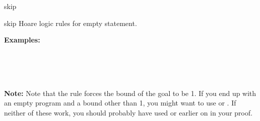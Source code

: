 \begin{tactic}{skip}
  \begin{tsyntax}{skip} Hoare logic rules for empty statement.

  \textbf{Examples:} 
  \begin{mathpar}
    {}%
    \quad{} \\
    {}%
    \quad{} \\
    {}%
    \quad{} \\
  \end{mathpar}

  \textbf{Note:} Note that the \phl rule forces the bound of the goal
  to be 1. If you end up with an empty program and a bound other than
  1, you might want to use  or . If
  neither of these work, you should probably have used 
  or  earlier on in your proof.
  \end{tsyntax}
\end{tactic}
